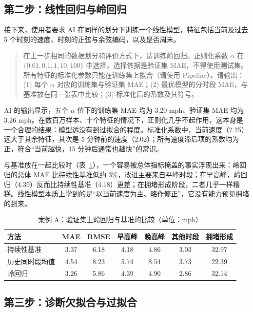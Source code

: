 \subsection{第二步：线性回归与岭回归}

接下来，使用者要求 AI 在同样的划分下训练一个线性模型，特征包括当前及过去 5 个时刻的速度、时刻的正弦与余弦编码，以及是否周末。

\begin{quote}
在上一步相同的数据划分和评价方式下，请训练岭回归。正则化系数 $\alpha$ 在 $\{0.01, 0.1, 1, 10, 100\}$ 中选择，选择依据是验证集 MAE，不得使用测试集。所有特征的标准化参数只能在训练集上拟合（请使用 Pipeline）。请输出：(1) 每个 $\alpha$ 对应的训练集与验证集 MAE；(2) 最优模型的分时段 MAE，与基准放在同一张表中比较；(3) 标准化后的系数及其符号。
\end{quote}

AI 的输出显示，五个 $\alpha$ 值下的训练集 MAE 均为 3.20 mph、验证集 MAE 均为 3.26 mph。在数百万样本、十个特征的情况下，正则化几乎不起作用，这本身是一个合理的结果：模型远没有到过拟合的程度。标准化系数中，当前速度（7.75）远大于其余特征，其次是 5 分钟前的速度（2.02）；所有速度滞后项的系数均为正，符合“当前越快，15 分钟后通常也越快”的常识。

与基准放在一起比较时（表~\ref{tab:ch7_ridge}），一个容易被总体指标掩盖的事实浮现出来：岭回归的总体 MAE 比持续性基准低约 3\%，改进主要来自平峰时段；在早高峰，岭回归（4.39）反而比持续性基准（4.18）更差；在拥堵形成阶段，二者几乎一样糟糕。线性模型本质上学到的是“以当前速度为主、略作修正”，它没有能力预见拥堵的到来。

\begin{table}[H]
\centering
\caption{案例 A：验证集上岭回归与基准的比较（单位：mph）}
\label{tab:ch7_ridge}
\begin{tabular}{lcccccc}
\toprule
方法 & MAE & RMSE & 早高峰 & 晚高峰 & 其他时段 & 拥堵形成 \\
\midrule
持续性基准 & 3.37 & 6.18 & 4.18 & 4.86 & 3.03 & 32.97 \\
历史同时段均值 & 4.54 & 8.23 & 5.74 & 8.54 & 3.73 & 22.39 \\
岭回归 & 3.26 & 5.86 & 4.39 & 4.90 & 2.86 & 32.14 \\
\bottomrule
\end{tabular}
\end{table}

\subsection{第三步：诊断欠拟合与过拟合}

